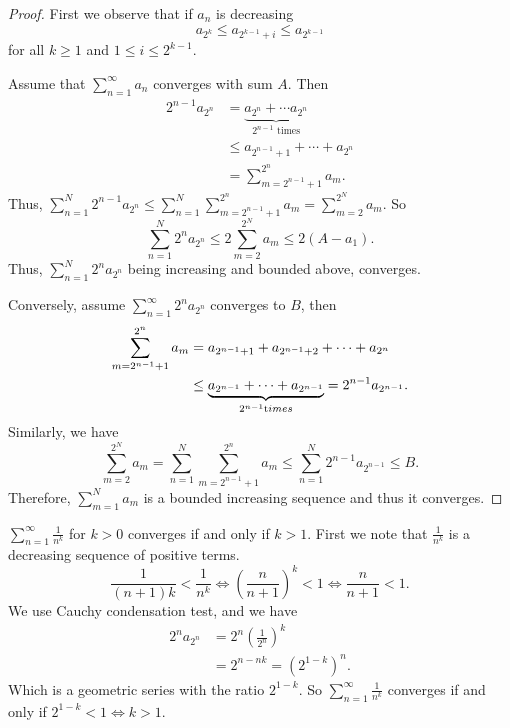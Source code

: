 \begin{proof}
    First we observe that if \(a_n\) is decreasing
    \[a_{2^k} \leq a_{2^{k-1} + i}\leq a_{2^{k-1}}\] 
    for all \(k \geq 1\) and \(1 \leq i\leq 2^{k-1}\).

    Assume that \(\sum\limits_{n=1}^{\infty} a_n\) converges with sum \(A\). Then
    \begin{align*}
    2^{n - 1}a_{2^n} &= \underbrace{a_{2^n} + \cdots a_{2^n}}_{2^{n-1} \text{ times}}\\
    &\leq a_{2^{n -1 } + 1} + \cdots + a_{2^n}\\
    &= \sum\limits_{m=2^{n-1}+1}^{2^n} a_m.
    \end{align*}
    Thus, \(\sum\limits_{n=1}^{N} 2^{n-1}a_{2^n}\leq \sum\limits_{n=1}^{N} \sum\limits_{m=2^{n-1}+1}^{2^n} a_m = \sum\limits_{m=2}^{2^N} a_m\). So
    \[
        \sum\limits_{n=1}^{N} 2^{n}a_{2^n} \leq 2 \sum\limits_{m=2}^{2^N} a_m \leq 2(A-a_1).
    \]
    Thus, \(\sum\limits_{n=1}^{N} 2^n a_{2^n}\) being increasing and bounded above, converges.

    Conversely, assume \(\sum\limits_{n=1}^{\infty} 2^n a_{2^n}\) converges to \(B\), then
    \begin{align*}
        \sum\limits_{m=2^{n - 1}+1}^{2^n} a_m &= a_{2^{n-1} + 1} + a_{2^{n-1}+2} + \cdots + a_{2^n}\\
        &\leq \underbrace{a_{2^{n-1}} + \cdots + a_{2^{n-1}}}_{2^{n-1} \text times} = 2^{n-1}a_{2^{n-1}}.
    \end{align*}
    Similarly, we have
    \[
        \sum\limits_{m=2}^{2^N} a_m = \sum\limits_{n=1}^{N} \sum\limits_{m=2^{n-1}+1}^{2^n} a_m \leq \sum\limits_{n=1}^{N} 2^{n-1}a_{2^{n-1}} \leq B.
    \]
    Therefore, \(\sum\limits_{m=1}^{N} a_m\) is a bounded increasing sequence and thus it converges.
\end{proof}
\begin{example}
    \(\sum\limits_{n=1}^{\infty} \frac{1}{n^k}\) for \(k > 0\) converges if and only if \(k > 1\). First we note that \(\frac{1}{n^k}\) is a decreasing sequence of positive terms.
    \[
        \frac{1}{(n + 1)k}<\frac{1}{n^k} \iff (\frac{n}{n+1})^k<1 \iff \frac{n}{n+1}<1.
    \]
    We use Cauchy condensation test, and we have
    \begin{align*}
        2^n a_{2^n} &= 2^{n}\left(\frac{1}{2^n}\right)^k\\
        &= 2^{n - nk} = (2^{1-k})^n.
    \end{align*}
    Which is a geometric series with the ratio \(2^{1-k}\). So \(\sum\limits_{n=1}^{\infty} \frac{1}{n^k}\) converges if and only if \(2^{1-k} < 1 \iff k > 1\).
\end{example}
